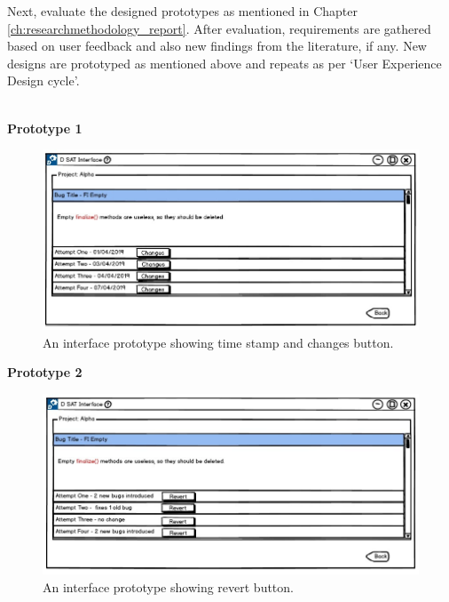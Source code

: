 Next, evaluate the designed prototypes as mentioned in Chapter \ref{ch:researchmethodology_report}. After evaluation, requirements are gathered based on user feedback and also new findings from the literature, if any. New designs are prototyped as mentioned above and repeats as per ‘User Experience Design cycle’. \\ \\

\clearpage

\textbf{Prototype 1}
\begin{figure}[hbt!]
	\centering
	\includegraphics[width=\linewidth]{figures/d_changes}
	\caption{An interface prototype showing time stamp and changes button.}
	\label{fig:d_changes}
\end{figure}

\textbf{Prototype 2}
\begin{figure}[hbt!]
	\centering
	\includegraphics[width=\linewidth]{figures/d_revert}
	\caption{An interface prototype showing revert button.}
	\label{fig:d_revert}
\end{figure}

\let\cleardoublepage\clearpage


	